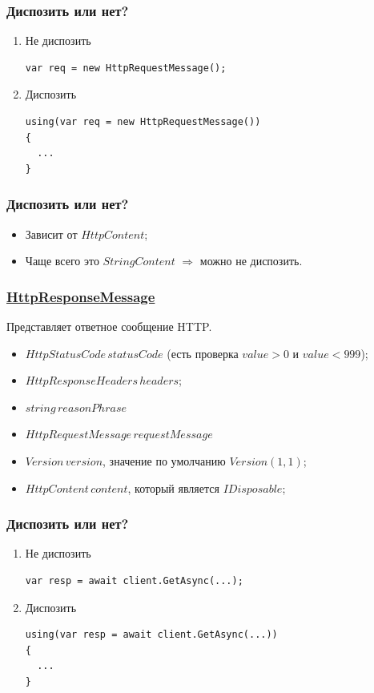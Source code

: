 \documentclass[17pt,aspectratio=169]{beamer}
\begin{document}
\begin{frame}[fragile]
\frametitle{Диспозить или нет?}
\begin{enumerate}
	\item <1-> Не диспозить
\begin{lstlisting}
var req = new HttpRequestMessage();
\end{lstlisting}
	\item <2-> Диспозить
\begin{lstlisting}
using(var req = new HttpRequestMessage())
{
  ...                
}
\end{lstlisting}
\end{enumerate}
\end{frame}

\begin{frame}
\frametitle{Диспозить или нет?}
\begin{itemize}
	\item <1-> Зависит от $HttpContent$; 
	\item <2-> Чаще всего это $StringContent$ $\Rightarrow$ можно не диспозить.
\end{itemize}
\end{frame}

\begin{frame}
\frametitle{\href{https://docs.microsoft.com/en-us/dotnet/api/system.net.http.httpresponsemessage?view=netcore-2.2}{HttpResponseMessage}}
Представляет ответное сообщение HTTP.
\begin{itemize}
	\item $HttpStatusCode\,statusCode$ (есть проверка $value > 0$ и $value < 999$);
	\item $HttpResponseHeaders\,headers$;
	\item $string\,reasonPhrase$
	\item $HttpRequestMessage\,requestMessage$
	\item $Version\,version$, значение по умолчанию $Version(1, 1)$;
	\item $HttpContent\,content$, который является $IDisposable$;
\end{itemize}
\end{frame}

\begin{frame}[fragile]
\frametitle{Диспозить или нет?}
\begin{enumerate}
	\item <1-> Не диспозить
\begin{lstlisting}
var resp = await client.GetAsync(...);
\end{lstlisting}
	\item <2-> Диспозить
\begin{lstlisting}
using(var resp = await client.GetAsync(...))
{
  ...                
}
\end{lstlisting}
\end{enumerate}
\end{frame}
\end{document}
